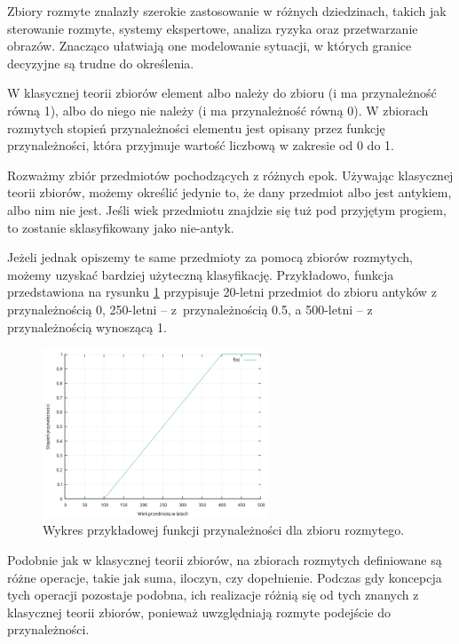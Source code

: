 Zbiory rozmyte znalazły szerokie zastosowanie w różnych dziedzinach, takich jak sterowanie
rozmyte, systemy ekspertowe, analiza ryzyka oraz przetwarzanie obrazów. Znacząco ułatwiają
one modelowanie sytuacji, w których granice decyzyjne są trudne do określenia.

W klasycznej teorii zbiorów element albo należy do zbioru (i ma przynależność równą 1),
albo do niego nie należy (i ma przynależność równą 0). W zbiorach rozmytych stopień
przynależności elementu jest opisany przez funkcję przynależności, która przyjmuje wartość
liczbową w zakresie od 0 do 1.

Rozważmy zbiór przedmiotów pochodzących z różnych epok. Używając klasycznej teorii zbiorów,
możemy określić jedynie to, że dany przedmiot albo jest antykiem, albo nim nie jest. Jeśli
wiek przedmiotu znajdzie się tuż pod przyjętym progiem, to zostanie sklasyfikowany jako nie-antyk.

Jeżeli jednak opiszemy te same przedmioty za pomocą zbiorów rozmytych, możemy uzyskać bardziej
użyteczną klasyfikację. Przykładowo, funkcja przedstawiona na rysunku \ref{fig:fuzzy-fn} przypisuje
20-letni przedmiot do zbioru antyków z przynależnością 0, 250-letni -- z~przynależnością 0.5, a
500-letni -- z przynależnością wynoszącą 1.

\begin{figure}[h]
	\centering
	\includegraphics[width=0.6\textwidth]{graf/Fuzzy-membership.png}
	\caption{Wykres przykładowej funkcji przynależności dla zbioru rozmytego.}
	\label{fig:fuzzy-fn}
\end{figure}

Podobnie jak w klasycznej teorii zbiorów, na zbiorach rozmytych definiowane są różne operacje,
takie jak suma, iloczyn, czy dopełnienie. Podczas gdy koncepcja tych operacji pozostaje podobna,
ich realizacje różnią się od tych znanych z klasycznej teorii zbiorów, ponieważ uwzględniają
rozmyte podejście do przynależności.

